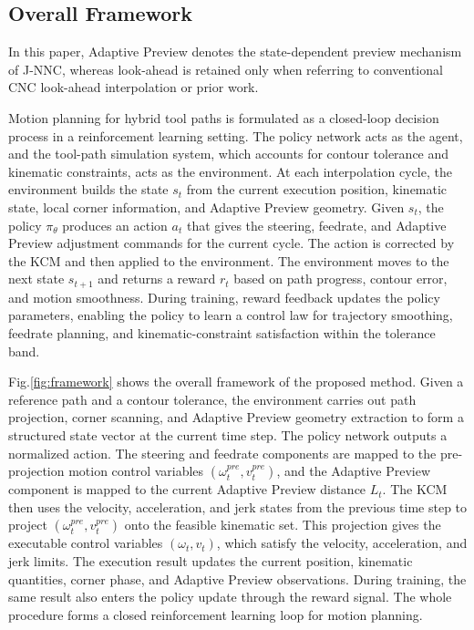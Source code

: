 \documentclass[preprint,12pt]{elsarticle}
\newcommand{\figref}[1]{Fig.\nobreakspace\ref{#1}}
\begin{document}
\subsection{Overall Framework}
In this paper, Adaptive Preview denotes the state-dependent preview mechanism of J-NNC, whereas look-ahead is retained only when referring to conventional CNC look-ahead interpolation or prior work.

Motion planning for hybrid tool paths is formulated as a closed-loop decision process in a reinforcement learning setting. The policy network acts as the agent, and the tool-path simulation system, which accounts for contour tolerance and kinematic constraints, acts as the environment. At each interpolation cycle, the environment builds the state $s_t$ from the current execution position, kinematic state, local corner information, and Adaptive Preview geometry. Given $s_t$, the policy $\pi_\theta$ produces an action $a_t$ that gives the steering, feedrate, and Adaptive Preview adjustment commands for the current cycle. The action is corrected by the KCM and then applied to the environment. The environment moves to the next state $s_{t+1}$ and returns a reward $r_t$ based on path progress, contour error, and motion smoothness. During training, reward feedback updates the policy parameters, enabling the policy to learn a control law for trajectory smoothing, feedrate planning, and kinematic-constraint satisfaction within the tolerance band.

\figref{fig:framework} shows the overall framework of the proposed method. Given a reference path and a contour tolerance, the environment carries out path projection, corner scanning, and Adaptive Preview geometry extraction to form a structured state vector at the current time step. The policy network outputs a normalized action. The steering and feedrate components are mapped to the pre-projection motion control variables $(\omega^{pre}_t, v^{pre}_t)$, and the Adaptive Preview component is mapped to the current Adaptive Preview distance $L_t$. The KCM then uses the velocity, acceleration, and jerk states from the previous time step to project $(\omega^{pre}_t, v^{pre}_t)$ onto the feasible kinematic set. This projection gives the executable control variables $(\omega_t, v_t)$, which satisfy the velocity, acceleration, and jerk limits. The execution result updates the current position, kinematic quantities, corner phase, and Adaptive Preview observations. During training, the same result also enters the policy update through the reward signal. The whole procedure forms a closed reinforcement learning loop for motion planning.
\end{document}
